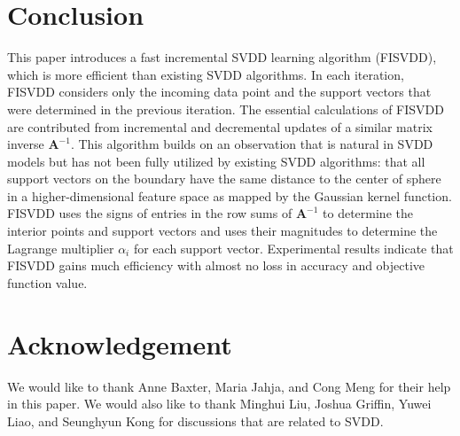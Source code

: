 \documentclass{article}
\numberwithin{equation}{section}
\begin{document}
\section{Conclusion}\label{conclusion}
This paper introduces a fast incremental SVDD learning algorithm (FISVDD), which is more efficient than existing SVDD algorithms. In each iteration, FISVDD considers only the incoming data point and the support vectors that were determined in the previous iteration. The essential calculations of FISVDD are contributed from incremental and decremental updates of a similar matrix inverse $\mathbf{A}^{-1}$. This algorithm builds on an observation that is natural in SVDD models but has not been fully utilized by existing SVDD algorithms: that all support vectors on the boundary have the same distance to the center of sphere in a higher-dimensional feature space as mapped by the Gaussian kernel function. FISVDD uses the signs of entries in the row sums of $\mathbf{A}^{-1}$ to determine the interior points and support vectors and uses their magnitudes to determine the Lagrange multiplier $\alpha_i$ for each support vector. Experimental results indicate that FISVDD gains much efficiency with almost no loss in accuracy and objective function value. 


\section*{Acknowledgement}
We would like to thank Anne Baxter, Maria Jahja, and Cong Meng for their help in this paper. We would also like to thank Minghui Liu, Joshua Griffin, Yuwei Liao, and Seunghyun Kong for discussions that are related to SVDD.




\end{document}
